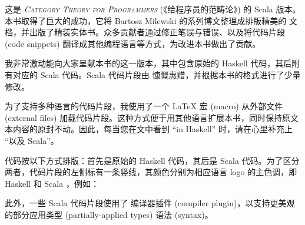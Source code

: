 
\lettrine[lhang=0.17]{这}{是 \emph{Category Theory for Programmers}} (《给程序员的范畴论》) 的 Scala 版本。本书取得了巨大的成功，它将 Bartosz Milewski 的系列博文整理成排版精美的  文档，并出版了精装实体书。众多贡献者通过修正笔误与错误、以及将代码片段 (code snippets) 翻译成其他编程语言等方式，为改进本书做出了贡献。

我非常激动能向大家呈献本书的这一版本，其中包含原始的 Haskell 代码，其后附有对应的 Scala 代码。Scala 代码片段由  慷慨惠赠，并根据本书的格式进行了少量修改。

为了支持多种语言的代码片段，我使用了一个 \LaTeX{} 宏 (macro) 从外部文件 (external files) 加载代码片段。这种方式便于用其他语言扩展本书，同时保持原文本内容的原封不动。因此，每当您在文中看到 “in Haskell” 时，请在心里补充上 “以及 Scala”。

代码按以下方式排版：首先是原始的 Haskell 代码，其后是 Scala 代码。为了区分两者，代码片段的左侧标有一条竖线，其颜色分别为相应语言 logo 的主色调，即 Haskell  和 Scala ，例如：

\unskip
{}
\NoIndentAfterThis
此外，一些 Scala 代码片段使用了  编译器插件 (compiler plugin)，以支持更美观的部分应用类型 (partially-applied types) 语法 (syntax)。